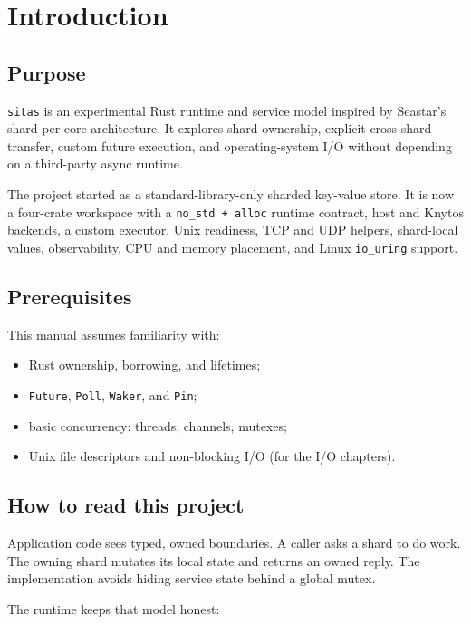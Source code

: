 \chapter{Introduction}
\label{chap:introduction}

\section{Purpose}

\texttt{sitas} is an experimental Rust runtime and service model inspired by
Seastar's shard-per-core architecture. It explores shard ownership, explicit
cross-shard transfer, custom future execution, and operating-system I/O without
depending on a third-party async runtime.

The project started as a standard-library-only sharded key-value store. It is
now a four-crate workspace with a \texttt{no\_std + alloc} runtime contract,
host and Knytos backends, a custom executor, Unix readiness, TCP and UDP
helpers, shard-local values, observability, CPU and memory placement, and Linux
\texttt{io\_uring} support.

\section{Prerequisites}

This manual assumes familiarity with:

\begin{itemize}
    \item Rust ownership, borrowing, and lifetimes;
    \item \texttt{Future}, \texttt{Poll}, \texttt{Waker}, and \texttt{Pin};
    \item basic concurrency: threads, channels, mutexes;
    \item Unix file descriptors and non-blocking I/O (for the I/O chapters).
\end{itemize}

\section{How to read this project}

Application code sees typed, owned boundaries. A caller asks a shard to do
work. The owning shard mutates its local state and returns an owned reply. The
implementation avoids hiding service state behind a global mutex.

The runtime keeps that model honest:

